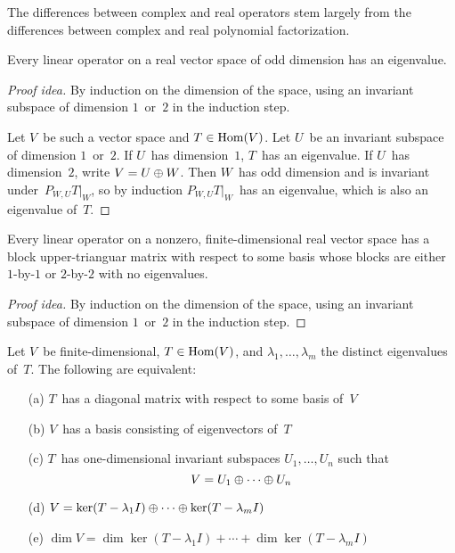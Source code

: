 \begin{rmk}
The differences between complex and real operators stem largely from the differences between complex and real polynomial factorization.
\end{rmk}

\begin{cor}
Every linear operator on a real vector space of odd dimension has an eigenvalue.
\end{cor}
\begin{proof}[Proof idea]
By induction on the dimension of the space, using an invariant subspace of dimension \(1\)~or~\(2\) in the induction step.

Let \(V\)~be such a vector space and \(T\in\operatorname{Hom}(V)\). Let \(U\)~be an invariant subspace of dimension \(1\)~or~\(2\). If \(U\)~has dimension~\(1\), \(T\)~has an eigenvalue. If \(U\)~has dimension~\(2\), write \(V=U\oplus W\). Then \(W\)~has odd dimension and is invariant under~\(P_{W,U}T|_W\), so by induction \(P_{W,U}T|_W\)~has an eigenvalue, which is also an eigenvalue of~\(T\).
\end{proof}

\begin{cor}
Every linear operator on a nonzero, finite-dimensional real vector space has a block upper-trianguar matrix with respect to some basis whose blocks are either \(1\)-by-\(1\) or \(2\)-by-\(2\) with no eigenvalues.
\end{cor}
\begin{proof}[Proof idea]
By induction on the dimension of the space, using an invariant subspace of dimension \(1\)~or~\(2\) in the induction step.
\end{proof}

\begin{thm}[Diagonalization]
Let \(V\)~be finite-dimensional, \(T\in\operatorname{Hom}(V)\), and \(\lambda_1,\ldots,\lambda_m\) the distinct eigenvalues of~\(T\). The following are equivalent:
\begin{enumerate}[itemsep=0pt]
\item[(a)] \(T\)~has a diagonal matrix with respect to some basis of~\(V\)
\item[(b)] \(V\)~has a basis consisting of eigenvectors of~\(T\)
\item[(c)] \(T\)~has one-dimensional invariant subspaces \(U_1,\ldots,U_n\) such that
\[V=U_1\oplus\cdots\oplus U_n\]
\item[(d)] \(V=\ker(T-\lambda_1I)\oplus\cdots\oplus\ker(T-\lambda_m I)\)
\item[(e)] \(\dim V=\dim\ker(T-\lambda_1I)+\cdots+\dim\ker(T-\lambda_m I)\)
\end{enumerate}
\end{thm}

